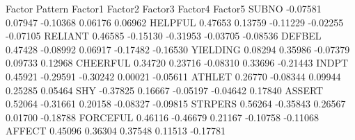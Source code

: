 \documentclass{article}
\begin{document}
\begin{Woutput}
                                     Factor Pattern
                 Factor1         Factor2         Factor3         Factor4         Factor5
SUBNO           -0.07581         0.07947        -0.10368         0.06176         0.06962
HELPFUL          0.47653         0.13759        -0.11229        -0.02255        -0.07105
RELIANT          0.46585        -0.15130        -0.31953        -0.03705        -0.08536
DEFBEL           0.47428        -0.08992         0.06917        -0.17482        -0.16530
YIELDING         0.08294         0.35986        -0.07379         0.09733         0.12968
CHEERFUL         0.34720         0.23716        -0.08310         0.33696        -0.21443
INDPT            0.45921        -0.29591        -0.30242         0.00021        -0.05611
ATHLET           0.26770        -0.08344         0.09944         0.25285         0.05464
SHY             -0.37825         0.16667        -0.05197        -0.04642         0.17840
ASSERT           0.52064        -0.31661         0.20158        -0.08327        -0.09815
STRPERS          0.56264        -0.35843         0.26567         0.01700        -0.18788
FORCEFUL         0.46116        -0.46679         0.21167        -0.10758        -0.11068
AFFECT           0.45096         0.36304         0.37548         0.11513        -0.17781


\end{Woutput}
\end{document}
